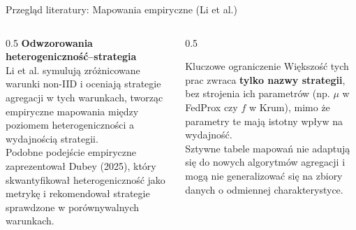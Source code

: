\documentclass[9pt,aspectratio=169]{beamer}
\begin{document}
\begin{frame}{Przegląd literatury: Mapowania empiryczne (Li et al.)}
\begin{columns}[T]
\begin{column}{0.5\textwidth}
\textbf{Odwzorowania heterogeniczność--strategia}\\[4pt]
Li et al. symulują zróżnicowane warunki non-IID i oceniają strategie agregacji w tych warunkach, tworząc empiryczne mapowania między poziomem heterogeniczności a wydajnością strategii.\\[6pt]
Podobne podejście empiryczne zaprezentował Dubey (2025), który skwantyfikował heterogeniczność jako metrykę i rekomendował strategie sprawdzone w porównywalnych warunkach.
\end{column}
\begin{column}{0.5\textwidth}
\begin{infobox}{Kluczowe ograniczenie}
Większość tych prac zwraca \textbf{tylko nazwy strategii}, bez strojenia ich parametrów (np. $\mu$ w FedProx czy $f$ w Krum), mimo że parametry te mają istotny wpływ na wydajność.\\[6pt]
Sztywne tabele mapowań nie adaptują się do nowych algorytmów agregacji i mogą nie generalizować się na zbiory danych o odmiennej charakterystyce.
\end{infobox}
\end{column}
\end{columns}
\end{frame}
\end{document}
